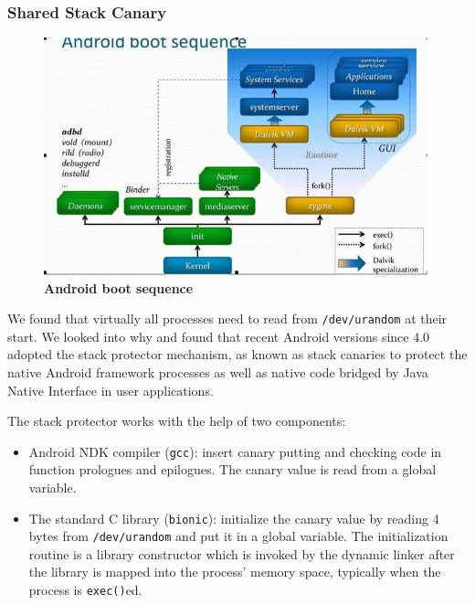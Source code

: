 \subsubsection{Shared Stack Canary}


\begin{figure}[t]
\begin{center}
\includegraphics[natwidth=640mm,natheight=392,scale=.3]{bootseq.png}
\end{center}
\caption{{\bf Android boot sequence}} 
\label{figzygote}
\end{figure}



We found that virtually all processes need to read from \verb|/dev/urandom| at their start. We looked into why and found that recent Android versions since 4.0 adopted the stack protector mechanism, as known as stack canaries to protect the native Android framework processes as well as native code bridged by Java Native Interface in user applications.

The stack protector works with the help of two components:
\begin{itemize}

\item Android NDK compiler (\verb|gcc|): insert canary putting and checking code in function prologues and epilogues. The canary value is read from a global variable.
\item The standard C library (\verb|bionic|): initialize the canary value by reading 4 bytes from \verb|/dev/urandom| and put it in a global variable. The initialization routine is a library constructor which is invoked by the dynamic linker after the library is mapped into the process' memory space, typically when the process is \verb|exec()|ed.
\end{itemize}

